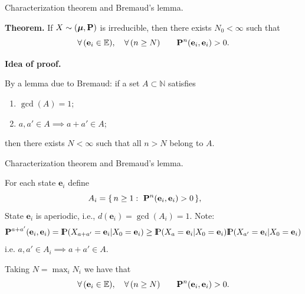 \documentclass[aspectratio=169]{beamer}
\newcommand{\Prob}{{\rm I\hspace{-0.8mm}P}}
\newcommand{\e}[0]{\textbf{e}}
\newcommand{\E}[0]{\mathbb{E}}
\begin{document}
\begin{frame}{Characterization theorem and Bremaud's lemma.}

\textbf{Theorem.}
If \(X\sim(\mbox{\boldmath $\mu$},\mathbf{P})\) is irreducible,
then there exists \(N_0<\infty\) such that
\[
\forall\, (\e_i \in\E),\quad \forall\, (n\geq N)\qquad  \bfP^{n}(\e_i,\e_i)>0.
\]

\medskip
\textbf{Idea of proof.}

By a lemma due to Bremaud:
if a set \(A\subset\mathbb{N}\) satisfies
\begin{enumerate}
\item \(\gcd(A)=1\);
\item \(a,a'\in A \implies a+a'\in A\);
\end{enumerate}
then there exists \(N<\infty\) such that all \(n>N\) belong to \(A\).

\end{frame}



\begin{frame}{Characterization theorem and Bremaud's lemma.}


For each state \(\e_i\) define
\[
A_i = \{\,n\ge1:\ \bfP^{n}(\e_i,\e_i)>0\,\},\qquad
\]
State $\e_i$ is aperiodic, i.e., $d(\e_i)=\gcd(A_i)=1.$
Note:
$$\bfP^{a+a'}(\e_i,\e_i)=\Prob(X_{a+a'}=\e_i|X_0=\e_i) \geq
\Prob(X_{a}=\e_i|X_0=\e_i)\Prob(X_{a'}=\e_i|X_0=\e_i)$$
i.e. $a,a'\in A_i \implies a+a'\in A$.
\begin{center}
\end{center}
\pause
\medskip
Taking $N=\max_i N_i$ we have that
$$\forall\, (\e_i \in\E),\quad \forall\, (n\geq N)\qquad  \bfP^{n}(\e_i,\e_i)>0.$$

\end{frame}
\end{document}
